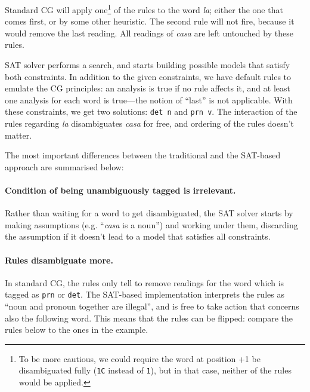 \documentclass[11pt]{article}
\begin{document}
Standard CG will apply one\footnote{To be more cautious, we could require the word at position +1 be disambiguated fully (\texttt{1C} instead of \texttt{1}), but in that case, 
neither of the rules would be applied.} of the rules to the word \emph{la}; 
either the one that comes first, or by some other heuristic. 
The second rule will not fire, because it would remove the last reading. 
All readings of \emph{casa} are left untouched by these rules.

SAT solver 
performs a search, 
and starts building possible models that satisfy both constraints. 
In addition to the given constraints, we have default rules to emulate
the CG principles: an analysis is true if no rule affects it,
and at least one analysis for each word is true---the notion of ``last'' is not applicable.
With these constraints, we get two solutions: \texttt{det n} and \texttt{prn v}. 
The interaction of the rules regarding \emph{la}  disambiguates \emph{casa} 
for free, and ordering of the rules doesn't matter. 


The most important differences between the traditional and the SAT-based approach are summarised below:

\paragraph{Condition of being unambiguously tagged is irrelevant.}
Rather than waiting for a word to get disambiguated, the SAT solver starts by 
making assumptions (e.g. ``\emph{casa} is a noun'') and working under them,
discarding the assumption if it doesn't lead to a model that satisfies all constraints.


\paragraph{Rules disambiguate more.}
In standard CG, the rules only tell to remove readings for the word which is tagged as 
\texttt{prn} or \texttt{det}. The SAT-based implementation interprets the rules as ``noun and pronoun together are illegal'', and is free to take action that concerns also the following word.
This means that the rules can be flipped: compare the rules below to the ones in the example.
\end{document}
